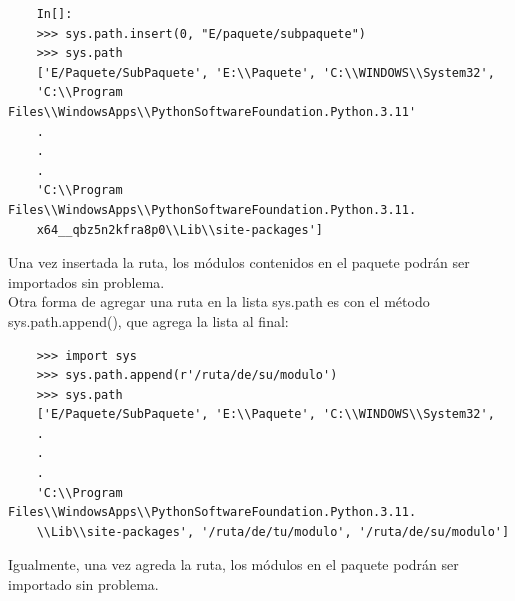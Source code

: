 \begin{lstlisting}
	In[]:
	>>> sys.path.insert(0, "E/paquete/subpaquete")
	>>> sys.path
	['E/Paquete/SubPaquete', 'E:\\Paquete', 'C:\\WINDOWS\\System32', 
	'C:\\Program Files\\WindowsApps\\PythonSoftwareFoundation.Python.3.11'
	.
	.
	.
	'C:\\Program Files\\WindowsApps\\PythonSoftwareFoundation.Python.3.11. 
	x64__qbz5n2kfra8p0\\Lib\\site-packages']
\end{lstlisting}	

Una vez insertada la ruta, los módulos contenidos en el paquete podrán ser importados sin problema.\\


Otra forma de agregar una ruta en la lista {\ttfamily sys.path} es con el método {\ttfamily sys.path.append()}, que agrega la lista al final:
\begin{lstlisting}
	>>> import sys
	>>> sys.path.append(r'/ruta/de/su/modulo')
	>>> sys.path
	['E/Paquete/SubPaquete', 'E:\\Paquete', 'C:\\WINDOWS\\System32',  
	.
	. 
	.
	'C:\\Program Files\\WindowsApps\\PythonSoftwareFoundation.Python.3.11.
	\\Lib\\site-packages', '/ruta/de/tu/modulo', '/ruta/de/su/modulo']
\end{lstlisting}

Igualmente, una vez agreda la ruta, los módulos en el paquete podrán ser importado sin problema.






